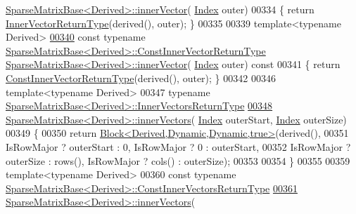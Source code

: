\begin{DoxyCode}
      \hyperlink{group___sparse_core___module_a65aaf3b50d205011e2bfa0de24756cce}{SparseMatrixBase<Derived>::innerVector}(
      \hyperlink{group___core___module_a554f30542cc2316add4b1ea0a492ff02}{Index} outer)
00334 \{ \textcolor{keywordflow}{return} \hyperlink{group___core___module_class_eigen_1_1_block}{InnerVectorReturnType}(derived(), outer); \}
00335 
00339 \textcolor{keyword}{template}<\textcolor{keyword}{typename} Derived>
\hyperlink{group___sparse_core___module_a1050a842569fcdadf8d936250301e72d}{00340} \textcolor{keyword}{const} \textcolor{keyword}{typename} \hyperlink{group___core___module_class_eigen_1_1_block}{SparseMatrixBase<Derived>::ConstInnerVectorReturnType}
       \hyperlink{group___sparse_core___module_a65aaf3b50d205011e2bfa0de24756cce}{SparseMatrixBase<Derived>::innerVector}(
      \hyperlink{group___core___module_a554f30542cc2316add4b1ea0a492ff02}{Index} outer)\textcolor{keyword}{ const}
00341 \textcolor{keyword}{}\{ \textcolor{keywordflow}{return} \hyperlink{group___core___module_class_eigen_1_1_block}{ConstInnerVectorReturnType}(derived(), outer); \}
00342 
00346 \textcolor{keyword}{template}<\textcolor{keyword}{typename} Derived>
00347 \textcolor{keyword}{typename} \hyperlink{group___core___module_class_eigen_1_1_block}{SparseMatrixBase<Derived>::InnerVectorsReturnType}
\hyperlink{group___sparse_core___module_a3c51bf5a7eb18eab9a85949d03aed14a}{00348} \hyperlink{group___sparse_core___module_a3c51bf5a7eb18eab9a85949d03aed14a}{SparseMatrixBase<Derived>::innerVectors}(
      \hyperlink{group___core___module_a554f30542cc2316add4b1ea0a492ff02}{Index} outerStart, \hyperlink{group___core___module_a554f30542cc2316add4b1ea0a492ff02}{Index} outerSize)
00349 \{
00350   \textcolor{keywordflow}{return} \hyperlink{group___core___module_class_eigen_1_1_block}{Block<Derived,Dynamic,Dynamic,true>}(derived(),
00351                                              IsRowMajor ? outerStart : 0, IsRowMajor ? 0 : outerStart,
00352                                              IsRowMajor ? outerSize : rows(), IsRowMajor ? cols() : 
      outerSize);
00353 
00354 \}
00355 
00359 \textcolor{keyword}{template}<\textcolor{keyword}{typename} Derived>
00360 \textcolor{keyword}{const} \textcolor{keyword}{typename} \hyperlink{group___core___module_class_eigen_1_1_block}{SparseMatrixBase<Derived>::ConstInnerVectorsReturnType}
\hyperlink{group___sparse_core___module_ae6585c991d04c139f2486ab81f56ad1a}{00361} \hyperlink{group___sparse_core___module_a3c51bf5a7eb18eab9a85949d03aed14a}{SparseMatrixBase<Derived>::innerVectors}(

\end{DoxyCode}
